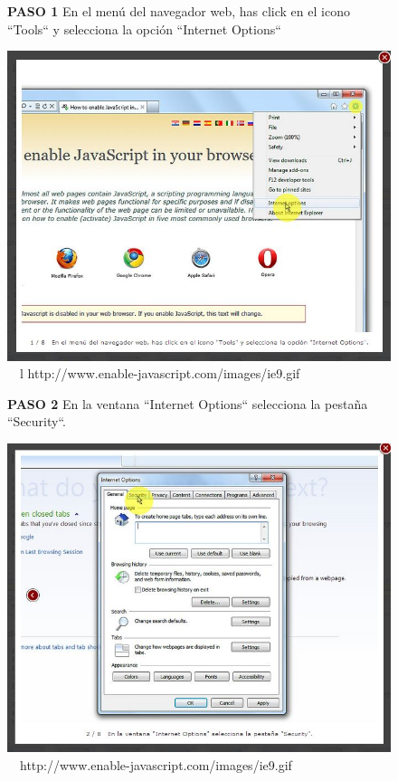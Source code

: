 \documentclass[11pt]{article} %
\begin{document}
\begin{figure}
\begin{center}
\begin{center}

\textbf{ PASO 1}
En el menú del navegador web, has click en el icono ``Tools`` y selecciona la opción ``Internet Options``
\end{center}
\includegraphics[height=8 cm, width=8 cm] {imagenes/explorer 01.JPG}
\newline
\newline
\ 
\ l {http://www.enable-javascript.com/images/ie9.gif }

\begin{center}

\textbf{ PASO 2 }
En la ventana ``Internet Options`` selecciona la pestaña ``Security``.
\end{center}

\includegraphics[height=8 cm, width=8 cm] {imagenes/explorer 02.JPG}
\newline
\newline
\ 
\  {http://www.enable-javascript.com/images/ie9.gif }

\end{center}
\end{figure}
\end{document}
